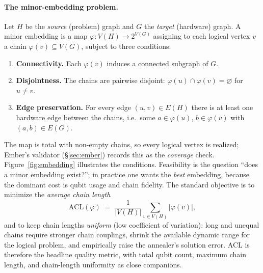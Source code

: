 \documentclass[acmsmall,anonymous,nonacm]{acmart}
\begin{document}
\paragraph{The minor-embedding problem.}
Let $H$ be the \emph{source} (problem) graph and $G$ the \emph{target}
(hardware) graph. A minor embedding is a map
$\varphi : V(H) \to 2^{V(G)}$ assigning to each logical vertex $v$ a chain
$\varphi(v)\subseteq V(G)$, subject to three conditions:
\begin{enumerate}
  \item \textbf{Connectivity.} Each $\varphi(v)$ induces a connected subgraph
        of $G$.
  \item \textbf{Disjointness.} The chains are pairwise disjoint:
        $\varphi(u)\cap\varphi(v)=\varnothing$ for $u\neq v$.
  \item \textbf{Edge preservation.} For every edge $(u,v)\in E(H)$ there is at
        least one hardware edge between the chains, i.e.\ some
        $a\in\varphi(u)$, $b\in\varphi(v)$ with $(a,b)\in E(G)$.
\end{enumerate}
The map is total with non-empty chains, so every logical vertex is realized;
Ember's validator (\S\ref{sec:ember}) records this as the \emph{coverage} check.
Figure~\ref{fig:embedding} illustrates the conditions. Feasibility is the
question ``does a minor embedding exist?''; in practice one wants the
\emph{best} embedding, because the dominant cost is qubit usage and chain
fidelity. The standard objective is to minimize the \emph{average chain length}
\begin{equation}
  \mathrm{ACL}(\varphi) \;=\; \frac{1}{|V(H)|}\sum_{v\in V(H)} |\varphi(v)|,
  \label{eq:acl}
\end{equation}
and to keep chain lengths \emph{uniform} (low coefficient of variation): long
and unequal chains require stronger chain couplings, shrink the available
dynamic range for the logical problem, and empirically raise the annealer's
solution error. ACL is therefore the headline quality metric, with total qubit
count, maximum chain length, and chain-length uniformity as close companions.
\end{document}
